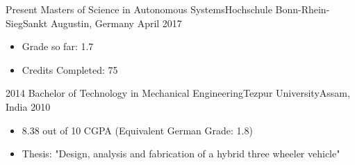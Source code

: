 %
%
%


\begin{experiences}
  \experience
    {Present}   {Masters of Science in Autonomous Systems}{Hochschule Bonn-Rhein-Sieg}{Sankt Augustin, Germany}
    {April 2017} {
                      \begin{itemize}
                        \item Grade so far: 1.7
                        \item Credits Completed: 75
                      \end{itemize}
                    }
                    {}
  \emptySeparator
  \experience
    {2014} {Bachelor of Technology in Mechanical
Engineering}{Tezpur University}{Assam, India}
    {2010}    {
                      \begin{itemize}
                        \item 8.38 out of 10 CGPA (Equivalent German Grade: 1.8)
                        \item Thesis: "Design, analysis and fabrication of a hybrid three wheeler vehicle"                  
                      \end{itemize}
                    }
                    {}
\end{experiences}